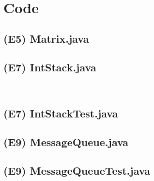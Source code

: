 \documentclass[main.tex]{subfiles}
\begin{document}
\section*{Code}

\subsection*{(E5) Matrix.java}

\newpage
\subsection*{(E7) IntStack.java}

\\  
\subsection*{(E7) IntStackTest.java}

\newpage
\subsection*{(E9) MessageQueue.java}

\newpage
\subsection*{(E9) MessageQueueTest.java}

\end{document}
